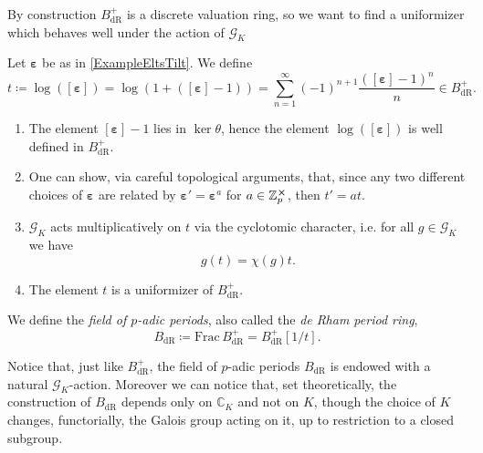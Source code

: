 \noindent
By construction $B_{\mathrm{dR}}^+$ is a discrete valuation ring,
so we want to find a uniformizer which behaves well under the action of $\mathscr{G}_K$
\begin{defn}[]
	Let $\boldsymbol\varepsilon$ be as in \cref{ExampleEltsTilt}.
	We define
	\begin{equation*}
		t \coloneqq \log \left( [\boldsymbol\varepsilon] \right) =
		\log \left( 1 + ([\boldsymbol\varepsilon] - 1)\right) =
		\sum_{n = 1 }^{ \infty } (-1)^{n+1} 
		\frac{ ([\boldsymbol\varepsilon] - 1)^n }{ n }
		\in B_{\mathrm{dR}}^+
	.\end{equation*}
\end{defn}


\begin{rem}\leavevmode\vspace{-\baselineskip}
\begin{enumerate}
	\item The element $[\boldsymbol\varepsilon] - 1 $ lies in
		$\ker \theta$, hence the element $\log ([\boldsymbol\varepsilon])$
		is well defined in $B_{\mathrm{dR}}^+$.

	\item One can show, via careful topological arguments, that,
		since any two different choices of $\boldsymbol\varepsilon$
		are related by $\boldsymbol\varepsilon' = \boldsymbol\varepsilon^a$
		for $a \in \mathbb{Z}_{p}^{\cross}$, then
		$t' = a t$.

	\item $\mathscr{G}_K$ acts multiplicatively on $t$ via the cyclotomic character,
		i.e. for all $g \in \mathscr{G}_K$ we have
		\begin{equation*}
		g(t) = \chi(g) t
		.\end{equation*}

	\item The element $t$ is a uniformizer of $B_{\mathrm{dR}}^+$.
\end{enumerate}
\end{rem}


\begin{defn}
	We define the {\em field of $p$-adic periods}, also called
	the {\em de Rham period ring},
	\begin{equation*}
	B_{\mathrm{dR}} \coloneqq \mathrm{Frac}\, B_{\mathrm{dR}}^+ =
	B_{\mathrm{dR}}^+[1/t]
	.\end{equation*}
\end{defn}


\begin{rem}[]
	Notice that, just like $B_{\mathrm{dR}}^+$, the field of $p$-adic periods
	$B_{\mathrm{dR}}$ is endowed with a natural $\mathscr{G}_K$-action.
	Moreover we can notice that, set theoretically, the construction of
	$B_{\mathrm{dR}}$ depends only on $\mathbb{C}_K$ and not on $K$,
	though the choice of $K$ changes, functorially, the Galois group acting on it,
	up to restriction to a closed subgroup.
\end{rem}


